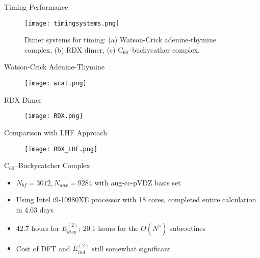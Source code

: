 \documentclass{beamer}
\begin{document}
        \begin{frame}{Timing Performance}
            \begin{figure}
                \centering
                \texttt{[image: timingsystems.png]}
                \caption{Dimer systems for timing: (a) Watson-Crick adenine-thymine complex, (b) RDX dimer, (c) C$_{60}$--buckycather complex.}
            \end{figure}
        \end{frame}

        \begin{frame}{Watson-Crick Adenine-Thymine}
            \begin{figure}
                \centering
                \texttt{[image: wcat.png]}
            \end{figure}
        \end{frame}

        \begin{frame}{RDX Dimer}
            \begin{figure}
                \centering
                \texttt{[image: RDX.png]}
            \end{figure}
        \end{frame}

        \begin{frame}{Comparison with LHF Approach}
            \begin{figure}
                \centering
                \texttt{[image: RDX\_LHF.png]}
            \end{figure}
        \end{frame}

        \begin{frame}{C$_{60}$--Buckycatcher Complex}
            \begin{itemize}
                \item $N_{bf} = 3012, N_{aux} = 9284$ with aug-cc-pVDZ basis set
                \item Using Intel i9-10980XE processor with 18 cores, completed entire calculation in 4.03 days
                \item 42.7 hours for $E_{disp}^{(2)}$; 20.1 hours for the $O(N^5)$ subroutines
                \item Cost of DFT and $E_{ind}^{(2)}$ still somewhat significant
            \end{itemize}
        \end{frame}
\end{document}
